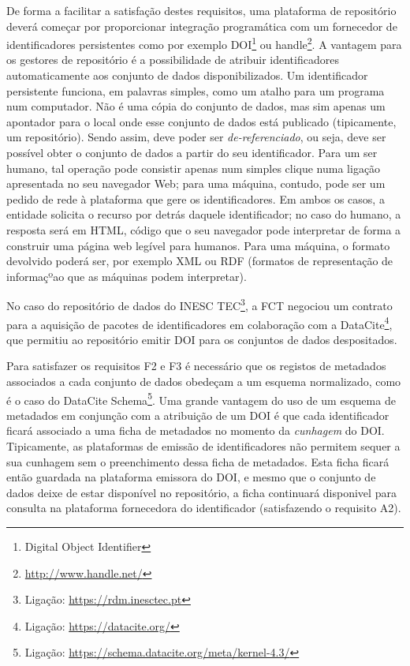 \documentclass[sigconf,nonacm]{acmart}
\begin{document}
De forma a facilitar a satisfação destes requisitos, uma plataforma de repositório deverá começar por proporcionar integração programática com um fornecedor de identificadores persistentes como por exemplo DOI\footnote{Digital Object Identifier} ou handle\footnote{\url{http://www.handle.net/}}. A vantagem para os gestores de repositório é a possibilidade de atribuir identificadores automaticamente aos conjunto de dados disponibilizados. Um identificador persistente funciona, em palavras simples, como um atalho para um programa num computador. Não é uma cópia do conjunto de dados, mas sim apenas um apontador para o local onde esse conjunto de dados está publicado (tipicamente, um repositório). Sendo assim, deve poder ser \emph{de-referenciado}, ou seja, deve ser possível obter o conjunto de dados a partir do seu identificador. Para um ser humano, tal operação pode consistir apenas num simples clique numa ligação apresentada no seu navegador Web; para uma máquina, contudo, pode ser um pedido de rede à plataforma que gere os identificadores. Em ambos os casos, a entidade solicita o recurso por detrás daquele identificador; no caso do humano, a resposta será em HTML, código que o seu navegador pode interpretar de forma a construir  uma página web legível para humanos. Para uma máquina, o formato devolvido poderá ser, por exemplo XML ou RDF (formatos de representação de informaçºao que as máquinas podem interpretar). 

No caso do repositório de dados do INESC TEC\footnote{Ligação: \url{https://rdm.inesctec.pt}}, a FCT negociou um contrato para a aquisição de pacotes de identificadores em colaboração com a DataCite\footnote{Ligação: \url{https://datacite.org/}}, que permitiu ao repositório emitir DOI para os conjuntos de dados despositados. 

Para satisfazer os requisitos F2 e F3 é necessário que os registos de metadados associados a cada conjunto de dados obedeçam a um esquema normalizado, como é o caso do DataCite Schema\footnote{Ligação: \url{https://schema.datacite.org/meta/kernel-4.3/}}. Uma grande vantagem do uso de um esquema de metadados em conjunção com a atribuição de um DOI é que cada identificador ficará associado a uma ficha de metadados no momento da \emph{cunhagem} do DOI. Tipicamente, as plataformas de emissão de identificadores não permitem sequer a sua cunhagem sem o preenchimento dessa ficha de metadados. Esta ficha ficará então guardada na plataforma emissora do DOI, e mesmo que o conjunto de dados deixe de estar disponível no repositório, a ficha continuará disponivel para consulta na plataforma fornecedora do identificador (satisfazendo o requisito A2).
\end{document}
